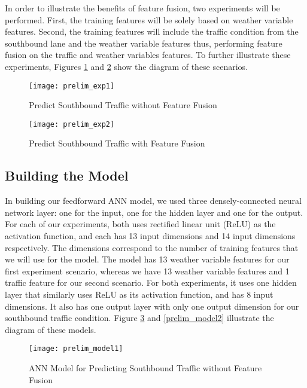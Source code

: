 In order to illustrate the benefits of feature fusion, two experiments will be performed. First, the training features will be solely based on weather variable features. Second, the training features will include the traffic condition from the southbound lane and the weather variable features thus, performing feature fusion on the traffic and weather variables features. To further illustrate these experiments, Figures \ref{figure:prelim_exp1} and \ref{figure:prelim_exp2} show the diagram of these scenarios.




\begin{figure}[h]
\caption{Predict Southbound Traffic without Feature Fusion}
\centering
\texttt{[image: prelim\_exp1]}
\label{figure:prelim_exp1}
\end{figure}

\begin{figure}[h]
\caption{Predict Southbound Traffic with Feature Fusion}
\centering
\texttt{[image: prelim\_exp2]}
\label{figure:prelim_exp2}
\end{figure}

\subsection{Building the Model}
In building our feedforward ANN model, we used three densely-connected neural network layer: one for the input, one for the hidden layer and one for the output. For each of our experiments, both uses rectified linear unit (ReLU) as the activation function, and each has 13 input dimensions and 14 input dimensions respectively. The dimensions correspond to the number of training features that we will use for the model. The model has 13 weather variable features for our first experiment scenario, whereas we have 13 weather variable features and 1 traffic feature for our second scenario. For both experiments, it uses one hidden layer that similarly uses ReLU as its activation function, and has 8 input dimensions. It also has one output layer with only one output dimension for our southbound traffic condition. Figure \ref{prelim_model1} and \ref{prelim_model2} illustrate the diagram of these models.


\begin{figure}[h]
\caption{ANN Model for Predicting Southbound Traffic without Feature Fusion}
\centering
\texttt{[image: prelim\_model1]}
\label{prelim_model1}
\end{figure}

